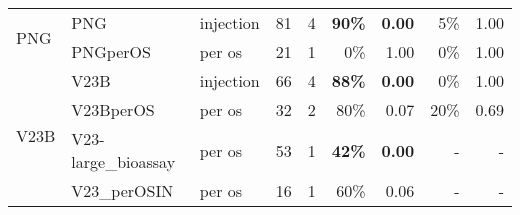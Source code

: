 \documentclass[12pt,letterpaper,english,bibliography=totocnumbered]{scrartcl}
\begin{document}
\begin{table}[h]
\begin{adjustbox}{width=\columnwidth,center}
\begin{tabular}{ l l l c c r r r r }
		\multirow{2}{*}{PNG}      & PNG\cite{moore_bioassay_2019-2}                 & injection       & 81               & 4                   & \textbf{90\%}                          & \textbf{0.00}                  & 5\%                                        & 1.00                           \\
		                          & PNGperOS\cite{moore_bioassay_2019-9}            & per os          & 21               & 1                   & 0\%                                    & 1.00                           & 0\%                                        & 1.00                           \\ \midrule
		\multirow{4}{*}{V23B}     & V23B\cite{moore_bioassay_2019-3}                & injection       & 66               & 4                   & \textbf{88\%}                          & \textbf{0.00}                  & 0\%                                        & 1.00                           \\
		                          & V23BperOS\cite{moore_bioassay_2019-5}           & per os          & 32               & 2                   & 80\%                                   & 0.07                           & 20\%                                       & 0.69                           \\
		                          & V23-large\_bioassay\cite{moore_bioassay_2019-4} & per os          & 53               & 1                   & \textbf{42\%}                          & \textbf{0.00}                  & -                                          & -                              \\
		                          & V23\_perOSIN\cite{moore_bioassay_2019-1}        & per os          & 16               & 1                   & 60\%                                   & 0.06                           & -                                          & -                              \\ \bottomrule
	\end{tabular}

	\end{adjustbox}
\end{table}
\end{document}
